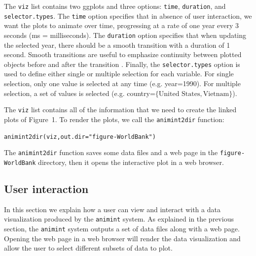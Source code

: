 \documentclass[journal]{vgtc}\usepackage[]{graphicx}\usepackage[]{color}
\makeatletter
\newcommand{\hlstr}[1]{\textcolor[rgb]{0.502,0,0}{#1}}%
\newcommand{\hlstd}[1]{\textcolor[rgb]{0,0,0}{#1}}%
\newcommand{\hlkwc}[1]{\textcolor[rgb]{0,0,1}{#1}}%
\newcommand{\hlkwd}[1]{\textcolor[rgb]{0,0,0}{#1}}%
\newenvironment{kframe}{%
 \def\at@end@of@kframe{}%
 \ifinner\ifhmode%
  \def\at@end@of@kframe{\end{minipage}}%
  \begin{minipage}{\columnwidth}%
 \fi\fi%
 \def\FrameCommand##1{\hskip\@totalleftmargin \hskip-\fboxsep
 \colorbox{shadecolor}{##1}\hskip-\fboxsep
     \hskip-\linewidth \hskip-\@totalleftmargin \hskip\columnwidth}%
 \MakeFramed {\advance\hsize-\width
   \@totalleftmargin\z@ \linewidth\hsize
   \@setminipage}}%
 {\par\unskip\endMakeFramed%
 \at@end@of@kframe}
\newenvironment{knitrout}{}{} %
\makeatother
\begin{document}
The \texttt{viz} list contains two ggplots and three options:
\texttt{time}, \texttt{duration}, and \texttt{selector.types}. The
\texttt{time} option specifies that in absence of user interaction, we
want the plots to animate over time, progressing at a rate of one year
every 3 seconds (ms = milliseconds). The \texttt{duration} option
specifies that when updating the selected year, there should be a
smooth transition with a duration of 1 second. Smooth transitions are
useful to emphasize continuity between plotted objects before and after the
transition \citep{animated-transitions}. Finally, the
\texttt{selector.types} option is used to define either single or
multiple selection for each variable. For single selection, only one
value is selected at any time (e.g. year=1990). For multiple
selection, a set of values is selected (e.g. country=$\{\textrm{United
  States}, \textrm{Vietnam}\}$).

The \texttt{viz} list contains all of the information that we need to
create the linked plots of Figure~1. To render the plots, we call the
\texttt{animint2dir} function:

\begin{knitrout}
\color{fgcolor}\begin{kframe}
\begin{alltt}
\hlkwd{animint2dir}\hlstd{(viz,} \hlkwc{out.dir}\hlstd{=}\hlstr{"figure-WorldBank"}\hlstd{)}
\end{alltt}
\end{kframe}
\end{knitrout}

The \texttt{animint2dir} function saves some data files and a web page
in the \texttt{figure-WorldBank} directory, then it opens the
interactive plot in a web browser.

\subsection{User interaction}

In this section we explain how a user can view and interact with a
data visualization produced by the \texttt{animint} system. As explained in the
previous section, the \texttt{animint} system outputs a set of data files along
with a web page. Opening the web page in a web browser will render the
data visualization and allow the user to select different subsets of data
to plot.
\end{document}
